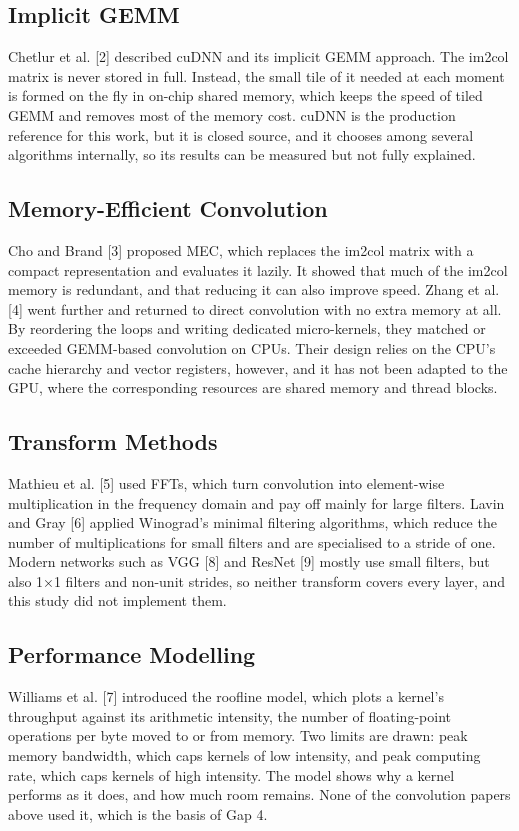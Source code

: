\documentclass[12pt,a4paper]{article}
\begin{document}
\subsection{Implicit GEMM}
Chetlur et al. [2] described cuDNN and its implicit GEMM approach. The im2col matrix is never stored in full. Instead, the small tile of it needed at each moment is formed on the fly in on-chip shared memory, which keeps the speed of tiled GEMM and removes most of the memory cost. cuDNN is the production reference for this work, but it is closed source, and it chooses among several algorithms internally, so its results can be measured but not fully explained.

\subsection{Memory-Efficient Convolution}
Cho and Brand [3] proposed MEC, which replaces the im2col matrix with a compact representation and evaluates it lazily. It showed that much of the im2col memory is redundant, and that reducing it can also improve speed. Zhang et al. [4] went further and returned to direct convolution with no extra memory at all. By reordering the loops and writing dedicated micro-kernels, they matched or exceeded GEMM-based convolution on CPUs. Their design relies on the CPU's cache hierarchy and vector registers, however, and it has not been adapted to the GPU, where the corresponding resources are shared memory and thread blocks.

\subsection{Transform Methods}
Mathieu et al. [5] used FFTs, which turn convolution into element-wise multiplication in the frequency domain and pay off mainly for large filters. Lavin and Gray [6] applied Winograd's minimal filtering algorithms, which reduce the number of multiplications for small filters and are specialised to a stride of one. Modern networks such as VGG [8] and ResNet [9] mostly use small filters, but also 1×1 filters and non-unit strides, so neither transform covers every layer, and this study did not implement them.

\subsection{Performance Modelling}
Williams et al. [7] introduced the roofline model, which plots a kernel's throughput against its arithmetic intensity, the number of floating-point operations per byte moved to or from memory. Two limits are drawn: peak memory bandwidth, which caps kernels of low intensity, and peak computing rate, which caps kernels of high intensity. The model shows why a kernel performs as it does, and how much room remains. None of the convolution papers above used it, which is the basis of Gap 4.
\end{document}
